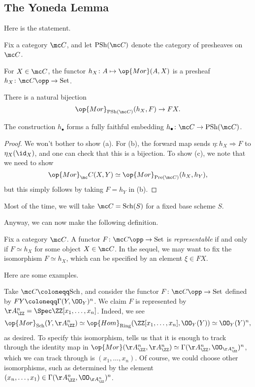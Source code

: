 \documentclass{article}
\begin{document}
\subsection{The Yoneda Lemma}
Here is the statement.
\begin{theorem}[Yoneda] \label{thm:yo}
	Fix a category $\mc C$, and let $\mathrm{PSh}(\mc C)$ denote the category of presheaves on $\mc C$.
	\begin{listalph}
		\item For $X\in\mc C$, the functor $h_X\colon A\mapsto\op{Mor}(A,X)$ is a presheaf $h_X\colon\mc C\opp\to\mathrm{Set}$.
		\item There is a natural bijection
		\[\op{Mor}_{\mathrm{PSh}(\mc C)}(h_X,F)\to FX.\]
		\item The construction $h_\bullet$ forms a fully faithful embedding $h_\bullet\colon\mc C\to\mathrm{PSh}(\mc C)$.
	\end{listalph}
\end{theorem}
\begin{proof}
	We won't bother to show (a). For (b), the forward map sends $\eta\colon h_X\Rightarrow F$ to $\eta_X({\id_X})$, and one can check that this is a bijection. To show (c), we note that we need to show
	\[\op{Mor}_\mc C(X,Y)\simeq\op{Mor}_{\mathrm{Pre}(\mc C)}(h_X,h_Y),\]
	but this simply follows by taking $F=h_Y$ in (b).
\end{proof}
\begin{remark}
	Most of the time, we will take $\mc C=\mathrm{Sch}(S)$ for a fixed base scheme $S$.
\end{remark}
Anyway, we can now make the following definition.
\begin{definition}[representable]
	Fix a category $\mc C$. A functor $F\colon\mc C\opp\to\mathrm{Set}$ is \textit{representable} if and only if $F\simeq h_X$ for some object $X\in\mc C$. In the sequel, we may want to fix the isomorphism $F\simeq h_X$, which can be specified by an element $\xi\in FX$.
\end{definition}
Here are some examples.
\begin{example}
	Take $\mc C\coloneqq\mathrm{Sch}$, and consider the functor $F\colon\mc C\opp\to\mathrm{Set}$ defined by $FY\coloneqq\Gamma(Y,\OO_Y)^n$. We claim $F$ is represented by $\AA^n_\ZZ=\Spec\ZZ[x_1,\ldots,x_n]$. Indeed, we see
	\[\op{Mor}_{\mathrm{Sch}}(Y,\AA^n_\ZZ)\simeq\op{Hom}_{\mathrm{Ring}}(\ZZ[x_1,\ldots,x_n],\OO_Y(Y))\simeq\OO_Y(Y)^n,\]
	as desired. To specify this isomorphism,  tells us that it is enough to track through the identity map in $\op{Mor}(\AA^n_\ZZ,\AA^n_\ZZ)\simeq\Gamma(\AA^n_\ZZ,\OO_{\AA^n_\ZZ})^n$, which we can track through is $(x_1,\ldots,x_n)$. Of course, we could choose other isomorphisms, such as determined by the element $(x_n,\ldots,x_1)\in\Gamma(\AA^n_\ZZ,\OO_{\AA^n_\ZZ})^n$.
\end{example}
\end{document}

